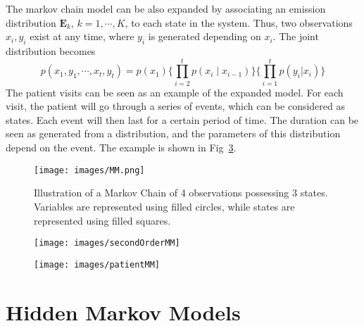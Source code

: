 The markov chain model can be also expanded by associating an emission distribution \(\mathbf{E}_k\), \(k = 1, \cdots , K\), to each state in the system. Thus, two observations \(x_i, y_i\) exist at any time, where \(y_i\) is generated depending on \(x_i\). The joint distribution becomes
\begin{equation}
	p(x_1, y_1, \cdots, x_t, y_t) = p(x_1)\{\prod_{i = 2}^{t} p(x_i \mid x_{i-1})\}\{\prod_{i=1}^{t}p(y_i|x_i)\}
\end{equation}
The patient visits can be seen as an example of the expanded model. For each visit, the patient will go through a series of events, which can be considered as states. Each event will then last for a certain period of time. The duration can be seen as generated from a distribution, and the parameters of this distribution depend on the event. The example is shown in Fig~\ref{fig:patientMM}.

\begin{figure}[ht]
	\begin{center}
		\texttt{[image: images/MM.png]}
		\caption{Illustration of a Markov Chain of 4 observations possessing 3 states. Variables are represented using filled circles, while states are represented using filled squares.}
		\label{fig:MM}
	\end{center}
\end{figure}

\begin{figure}[ht]
	\begin{center}
		\texttt{[image: images/secondOrderMM]}
		\label{fig:secondOrderMM}
	\end{center}
\end{figure}

\begin{figure}[ht]
	\begin{center}
		\texttt{[image: images/patientMM]}
		\label{fig:patientMM}
	\end{center}
\end{figure}


\section{Hidden Markov Models}
\label{sec:HMM}






